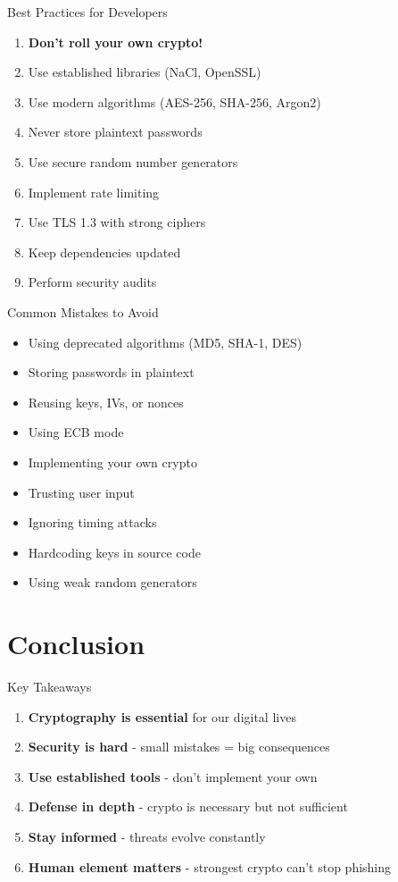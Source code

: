 \documentclass{beamer}
\begin{document}
\begin{frame}{Best Practices for Developers}
\begin{enumerate}
    \item \textbf{Don't roll your own crypto!}
    \item Use established libraries (NaCl, OpenSSL)
    \item Use modern algorithms (AES-256, SHA-256, Argon2)
    \item Never store plaintext passwords
    \item Use secure random number generators
    \item Implement rate limiting
    \item Use TLS 1.3 with strong ciphers
    \item Keep dependencies updated
    \item Perform security audits
\end{enumerate}
\end{frame}

\begin{frame}{Common Mistakes to Avoid}
\begin{itemize}
    \item Using deprecated algorithms (MD5, SHA-1, DES)
    \item Storing passwords in plaintext
    \item Reusing keys, IVs, or nonces
    \item Using ECB mode
    \item Implementing your own crypto
    \item Trusting user input
    \item Ignoring timing attacks
    \item Hardcoding keys in source code
    \item Using weak random generators
\end{itemize}
\end{frame}

\section{Conclusion}

\begin{frame}{Key Takeaways}
\begin{enumerate}
    \item \textbf{Cryptography is essential} for our digital lives
    \item \textbf{Security is hard} - small mistakes = big consequences
    \item \textbf{Use established tools} - don't implement your own
    \item \textbf{Defense in depth} - crypto is necessary but not sufficient
    \item \textbf{Stay informed} - threats evolve constantly
    \item \textbf{Human element matters} - strongest crypto can't stop phishing
\end{enumerate}
\end{frame}
\end{document}
